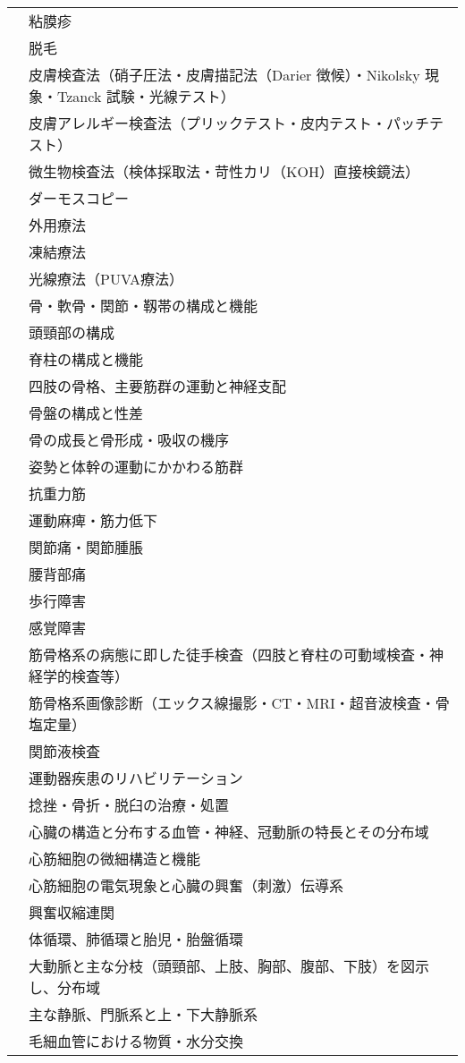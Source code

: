 \begin{xltabular}{\linewidth}{XX}
 & 粘膜疹 \\
 & 脱毛 \\
 & 皮膚検査法（硝子圧法・皮膚描記法（Darier 徴候）・Nikolsky 現象・Tzanck 試験・光線テスト） \\
 & 皮膚アレルギー検査法（プリックテスト・皮内テスト・パッチテスト） \\
 & 微生物検査法（検体採取法・苛性カリ（KOH）直接検鏡法） \\
 & ダーモスコピー \\
 & 外用療法 \\
 & 凍結療法 \\
 & 光線療法（PUVA療法） \\
 & 骨・軟骨・関節・靱帯の構成と機能 \\
 & 頭頸部の構成 \\
 & 脊柱の構成と機能 \\
 & 四肢の骨格、主要筋群の運動と神経支配 \\
 & 骨盤の構成と性差 \\
 & 骨の成長と骨形成・吸収の機序 \\
 & 姿勢と体幹の運動にかかわる筋群 \\
 & 抗重力筋 \\
 & 運動麻痺・筋力低下 \\
 & 関節痛・関節腫脹 \\
 & 腰背部痛 \\
 & 歩行障害 \\
 & 感覚障害 \\
 & 筋骨格系の病態に即した徒手検査（四肢と脊柱の可動域検査・神経学的検査等） \\
 & 筋骨格系画像診断（エックス線撮影・CT・MRI・超音波検査・骨塩定量） \\
 & 関節液検査 \\
 & 運動器疾患のリハビリテーション \\
 & 捻挫・骨折・脱臼の治療・処置 \\
 & 心臓の構造と分布する血管・神経、冠動脈の特長とその分布域 \\
 & 心筋細胞の微細構造と機能 \\
 & 心筋細胞の電気現象と心臓の興奮（刺激）伝導系 \\
 & 興奮収縮連関 \\
 & 体循環、肺循環と胎児・胎盤循環 \\
 & 大動脈と主な分枝（頭頸部、上肢、胸部、腹部、下肢）を図示し、分布域 \\
 & 主な静脈、門脈系と上・下大静脈系 \\
 & 毛細血管における物質・水分交換 \\

\end{xltabular}
